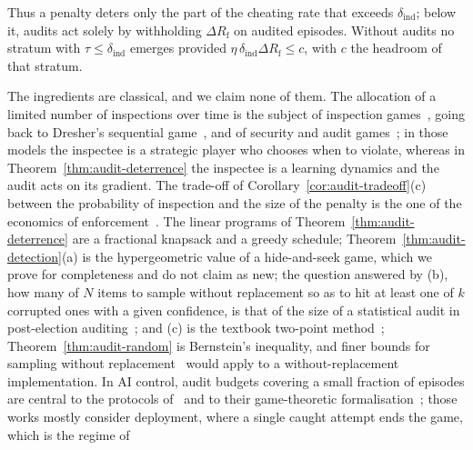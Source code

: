 \noindent
Thus a penalty deters only the part of the cheating rate that exceeds
$\delta_{\mathrm{ind}}$; below it, audits act solely by withholding $\Delta R_{\mathrm f}$
on audited episodes. Without audits no stratum with
$\tau\le\delta_{\mathrm{ind}}$ emerges provided
$\eta\,\delta_{\mathrm{ind}}\Delta R_{\mathrm f}\le c$, with $c$ the headroom of that
stratum.

\begin{remark}\label{rem:audit-related}
The ingredients are classical, and we claim none of them. The allocation of a
limited number of inspections over time is the subject of inspection
games~\cite{avenhaus2002inspection}, going back to Dresher's sequential
game~\cite{dresher1962sampling}, and of security and audit
games~\cite{tambe2011security,blocki2013audit}; in those models the inspectee is
a strategic player who chooses when to violate, whereas in
Theorem~\ref{thm:audit-deterrence} the inspectee is a learning dynamics and the
audit acts on its gradient. The trade-off of
Corollary~\ref{cor:audit-tradeoff}(c) between the probability of inspection and
the size of the penalty is the one of the economics of
enforcement~\cite{becker1968crime}. The linear programs of
Theorem~\ref{thm:audit-deterrence} are a fractional knapsack and a greedy
schedule; Theorem~\ref{thm:audit-detection}(a) is the hypergeometric value of a
hide-and-seek game, which we prove for completeness and do not claim as new;
the question answered by (b), how many of $N$ items to sample without
replacement so as to hit at least one of $k$ corrupted ones with a given
confidence, is that of the size of a statistical audit in post-election
auditing~\cite{rivest2006,aslam2007};
and (c) is the textbook two-point method~\cite{lecam1973convergence,yu1997assouad};
Theorem~\ref{thm:audit-random} is Bernstein's inequality, and finer bounds for
sampling without replacement~\cite{hoeffding1963probability,serfling1974probability}
would apply to a without-replacement implementation. In AI control, audit
budgets covering a small fraction of episodes are central to the protocols
of~\cite{greenblatt2023} and to their game-theoretic
formalisation~\cite{griffin2024}; those works mostly consider deployment, where a
single caught attempt ends the game, which is the regime of

\end{remark}
